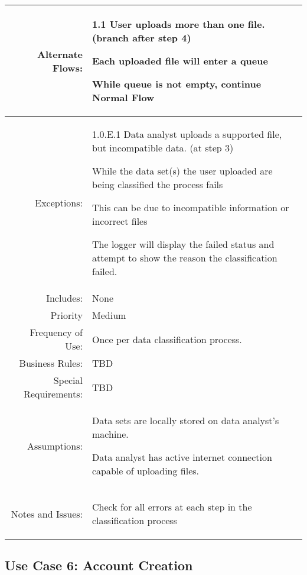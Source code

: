 \documentclass[12pt,oneside,letterpaper]{article}
\newenvironment{packed_enumerate}{ %
\vspace{-7mm}
\begin{enumerate}
  \setlength{\itemsep}{0pt}
  \setlength{\parskip}{0pt}
  \setlength{\parsep}{0pt}
}{\end{enumerate}
\vspace{-8mm}}
\begin{document}
\begin{longtable}{|r|p{3.8in}|}
\hline
Alternate Flows:&1.1 User uploads more than one file. (branch after step 4)\newline
\begin{packed_enumerate}
\item Each uploaded file will enter a queue
\item While queue is not empty, continue Normal Flow
\end{packed_enumerate}\\
\hline
Exceptions:&1.0.E.1 Data analyst uploads a supported file, but incompatible data. (at step 3)\newline
\begin{packed_enumerate}
\item While the data set(s) the user uploaded are being classified the process fails
\item This can be due to incompatible information or incorrect files
\item The logger will display the failed status and attempt to show the reason the classification failed.
\end{packed_enumerate}\\
\hline
Includes:&None\\
\hline
Priority&Medium\\
\hline
Frequency of Use:&Once per data classification process.\\
\hline
Business Rules:&TBD\\
\hline
Special Requirements:&TBD\\
\hline
Assumptions:&\begin{packed_enumerate}
\item Data sets are locally stored on data analyst's machine.
\item Data analyst has active internet connection capable of uploading files.
\end{packed_enumerate}\\
\hline
Notes and Issues:&\begin{packed_enumerate}
\item Check for all errors at each step in the classification process
\end{packed_enumerate}\\
\hline
\end{longtable}


\subsection{\label{Upload Data Sets}Use Case 6: Account Creation}
\end{document}
